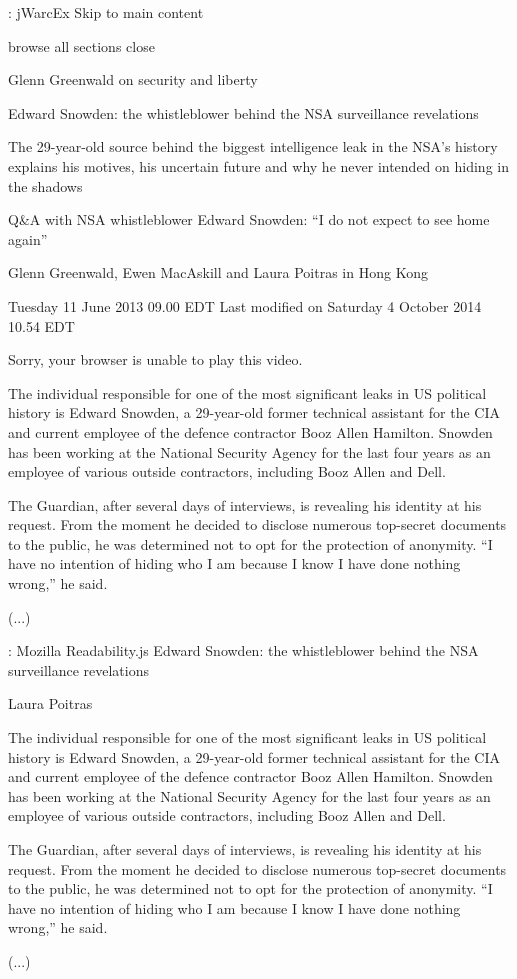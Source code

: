 \documentclass[12pt, utf8, ngerman]{beamer}
\begin{document}
\begin{frame}{\insertsection: jWarcEx}
    \scriptsize
    Skip to main content

    browse all sections close

    Glenn Greenwald on security and liberty

    Edward Snowden: the whistleblower behind the NSA surveillance revelations

    The 29-year-old source behind the biggest intelligence leak in the NSA's history explains his motives, his uncertain future and why he never intended on hiding in the shadows

    Q\&A with NSA whistleblower Edward Snowden: ``I do not expect to see home again''

    Glenn Greenwald, Ewen MacAskill and Laura Poitras in Hong Kong

    Tuesday 11 June 2013 09.00 EDT Last modified on Saturday 4 October 2014 10.54 EDT

    Sorry, your browser is unable to play this video.

    The individual responsible for one of the most significant leaks in US political history is Edward Snowden, a 29-year-old former technical assistant for the CIA and current employee of the defence contractor Booz Allen Hamilton. Snowden has been working at the National Security Agency for the last four years as an employee of various outside contractors, including Booz Allen and Dell.

    The Guardian, after several days of interviews, is revealing his identity at his request. From the moment he decided to disclose numerous top-secret documents to the public, he was determined not to opt for the protection of anonymity. ``I have no intention of hiding who I am because I know I have done nothing wrong,'' he said.

    (...)
\end{frame}

\begin{frame}{\insertsection: Mozilla Readability.js}
    \scriptsize
    Edward Snowden: the whistleblower behind the NSA surveillance revelations

    Laura Poitras

    The individual responsible for one of the most significant leaks in US political history is Edward Snowden, a 29-year-old former technical assistant for the CIA and current employee of the defence contractor Booz Allen Hamilton. Snowden has been working at the National Security Agency for the last four years as an employee of various outside contractors, including Booz Allen and Dell.

    The Guardian, after several days of interviews, is revealing his identity at his request. From the moment he decided to disclose numerous top-secret documents to the public, he was determined not to opt for the protection of anonymity. ``I have no intention of hiding who I am because I know I have done nothing wrong,'' he said.

    (...)
\end{frame}
\end{document}
